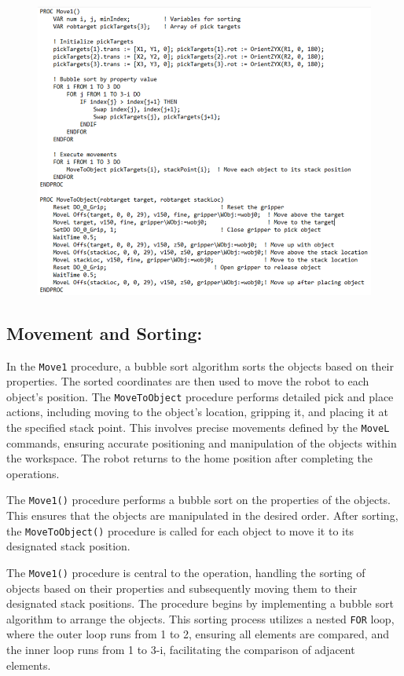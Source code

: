 \begin{figure}[H]
    \includegraphics[width=5.5in ]{pics/PICKtARG.png}
    \label{PICK}
\end{figure}

\subsection{Movement and Sorting:}
In the \texttt{Move1} procedure, a bubble sort algorithm sorts the objects based on their properties. The sorted coordinates are then used to move the robot to each object's position. The \texttt{MoveToObject} procedure performs detailed pick and place actions, including moving to the object's location, gripping it, and placing it at the specified stack point. This involves precise movements defined by the \texttt{MoveL} commands, ensuring accurate positioning and manipulation of the objects within the workspace. The robot returns to the home position after completing the operations.

The \texttt{Move1()} procedure performs a bubble sort on the properties of the objects. This ensures that the objects are manipulated in the desired order. After sorting, the \texttt{MoveToObject()} procedure is called for each object to move it to its designated stack position. 

The \texttt{Move1()} procedure is central to the operation, handling the sorting of objects based on their properties and subsequently moving them to their designated stack positions. The procedure begins by implementing a bubble sort algorithm to arrange the objects. This sorting process utilizes a nested \texttt{FOR} loop, where the outer loop runs from 1 to 2, ensuring all elements are compared, and the inner loop runs from 1 to 3-i, facilitating the comparison of adjacent elements.

